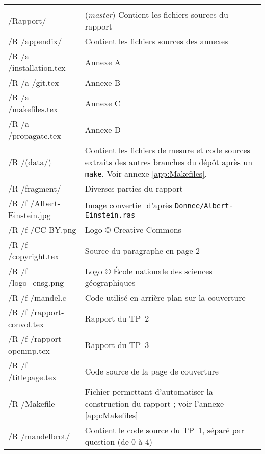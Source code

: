 \begin{onecolumn}
\begin{longtable}{>{\ttfamily}m{} p{}}
                               & \\
    /Rapport/                  & (\emph{master}) Contient les fichiers
                                 sources du rapport\\
    /R /appendix/              & Contient les fichiers sources des
                                 annexes\\
    /R /a /installation.tex    & Annexe A\\
    /R /a /git.tex             & Annexe B\\
    /R /a /makefiles.tex       & Annexe C\\
    /R /a /propagate.tex       & Annexe D\\
    /R /(data/)                & Contient les fichiers de mesure et
                                 code sources extraits des autres
                                 branches du dépôt après un
                                 \texttt{make}. Voir annexe
                                 \ref{app:Makefiles}.\\
    /R /fragment/              & Diverses parties du rapport\\
    /R /f /Albert-Einstein.jpg & Image\,\,convertie\,\,%
                                 d'après
                                 \texttt{Donnee/Albert-Einstein.ras}\\
    /R /f /CC-BY.png           & Logo © Creative Commons\\
    /R /f /copyright.tex       & Source du paragraphe en page 2\\
    /R /f /logo\_ensg.png      & Logo © École nationale des sciences
                                 géographiques\\
    /R /f /mandel.c            & Code utilisé en arrière-plan sur la
                                 couverture\\
    /R /f /rapport-convol.tex  & Rapport du TP~2\\
    /R /f /rapport-openmp.tex  & Rapport du TP~3\\
    /R /f /titlepage.tex       & Code source de la page de
                                 couverture\\
    /R /Makefile               & Fichier permettant d'automatiser la
                                 construction du rapport ; voir
                                 l'annexe \ref{app:Makefiles}\\
    /R /mandelbrot/            & Contient le code source du TP~1,
                                 séparé par question (de 0 à 4)\\

\end{longtable}
\end{onecolumn}
